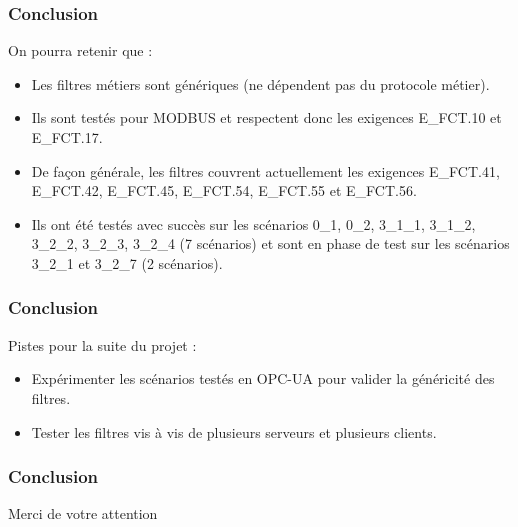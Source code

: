 \documentclass{beamer}
\begin{document}
\begin{frame}
    \frametitle{Conclusion}

    On pourra retenir que :
    \vfill
    \begin{itemize}
        \item Les filtres métiers sont génériques (ne dépendent pas du protocole métier).
            \vfill
        \item Ils sont testés pour MODBUS et respectent donc les exigences E\_FCT.10 et E\_FCT.17.
            \vfill
        \item De façon générale, les filtres couvrent actuellement les exigences
            E\_FCT.41, E\_FCT.42, E\_FCT.45, E\_FCT.54, E\_FCT.55 et E\_FCT.56.
            \vfill
        \item Ils ont été testés avec succès sur les scénarios
            0\_1, 0\_2, 3\_1\_1, 3\_1\_2, 3\_2\_2, 3\_2\_3, 3\_2\_4 (7 scénarios)
            et sont en phase de test sur les scénarios 3\_2\_1 et 3\_2\_7 (2 scénarios).
    \end{itemize}
\end{frame}

\begin{frame}
    \frametitle{Conclusion}

    Pistes pour la suite du projet :
    \vfill
    \begin{itemize}
        \item Expérimenter les scénarios testés en OPC-UA pour valider la généricité des filtres.
            \vfill
        \item Tester les filtres vis à vis de plusieurs serveurs et plusieurs clients.
    \end{itemize}
\end{frame}

\begin{frame}
    \frametitle{Conclusion}

    \begin{center}
        Merci de votre attention
    \end{center}
\end{frame}
\end{document}
